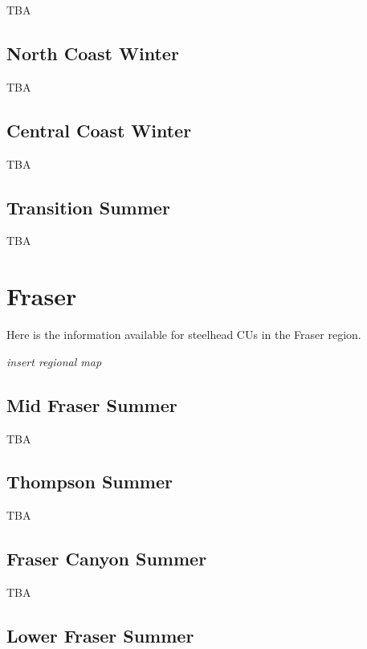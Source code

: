 \documentclass[
]{book}
\begin{document}
TBA

\hypertarget{north-coast-winter}{%
\section{North Coast Winter}\label{north-coast-winter}}

TBA

\hypertarget{central-coast-winter}{%
\section{Central Coast Winter}\label{central-coast-winter}}

TBA

\hypertarget{transition-summer}{%
\section{Transition Summer}\label{transition-summer}}

TBA

\hypertarget{fraser}{%
\chapter{Fraser}\label{fraser}}

Here is the information available for steelhead CUs in the Fraser region.

\emph{insert regional map}

\hypertarget{mid-fraser-summer}{%
\section{Mid Fraser Summer}\label{mid-fraser-summer}}

TBA

\hypertarget{thompson-summer}{%
\section{Thompson Summer}\label{thompson-summer}}

TBA

\hypertarget{fraser-canyon-summer}{%
\section{Fraser Canyon Summer}\label{fraser-canyon-summer}}

TBA

\hypertarget{lower-fraser-summer}{%
\section{Lower Fraser Summer}\label{lower-fraser-summer}}
\end{document}
